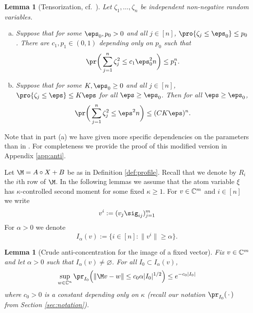 \documentclass[aop,preprint]{imsart}
\theoremstyle{plain}
\newtheorem{lemma}[theorem]{Lemma}
\theoremstyle{definition}
\theoremstyle{remark}
\numberwithin{equation}{section}
\numberwithin{theorem}{section}
\begin{document}
\begin{lemma}[Tensorization, cf.\ {\cite[Lemma 2.2]{RuVe:ilo}}]	\label{lem:tensorize}
Let $\zeta_1,\dots, \zeta_n$ be independent non-negative random variables.
\begin{enumerate}[(a)]
\item Suppose that for some $\eps_0,p_0>0$ and all $j\in [n]$, $\pro{\zeta_j\le \eps_0}\le p_0$. There are $c_1,p_1\in (0,1)$ depending only on $p_0$ such that
\begin{equation}
\pr\bigg( \sum_{j=1}^n \zeta_j^2 \le c_1\eps_0^2n\bigg) \le p_1^n.
\end{equation}
\item  Suppose that for some $K,\eps_0\ge 0$ and all $j\in [n]$, $\pro{\zeta_j\le\eps} \le K\eps$ for all $\eps\ge \eps_0$.
Then for all $\eps\ge \eps_0$,
\begin{equation}
\pr\bigg( \sum_{j=1}^n \zeta_j^2 \le\eps^2n \bigg) \le (CK\eps)^n.
\end{equation}
\end{enumerate}
\end{lemma}

Note that in part (a) we have given more specific dependencies on the parameters than in \citep{RuVe:ilo}. For completeness we provide the proof of this modified version in Appendix \ref{app:anti}.

Let $\M=A\circ X+B$ be as in Definition \ref{def:profile}.
Recall that we denote by $R_i$ the $i$th row of $\M$.
%
In the following lemmas we assume that the atom variable $\xi$ has $\kappa$-controlled second moment for some fixed $\kappa\ge1$.
For $v\in {\mathbb C}^m$ and $i\in [n]$ we write 
\begin{equation}	\label{def:vi}
v^i :=(v_j\sig_{ij})_{j=1}^m
\end{equation}
For $\alpha>0$ we denote 
\begin{equation}	\label{def:Ialpha}
I_\alpha(v):= \{i\in [n]: \|v^i\|\ge \alpha\}.
\end{equation}

\begin{lemma}[Crude anti-concentration for the image of a fixed vector]	\label{lem:fixed_crude}
Fix $v\in {\mathbb C}^m$ and let $\alpha>0$ such that $I_\alpha(v)\ne \varnothing$.
For all $I_0\subset I_\alpha(v)$, 
\begin{equation}
\sup_{w\in \C^n} \pr_{I_0}\Big( \|\M v -w\| \le c_0 \alpha|I_0|^{1/2} \Big) \le e^{-c_0|I_0|}
\end{equation}
where $c_0>0$ is a constant depending only on $\kappa$ (recall our notation $\pr_{I_0}(\,\cdot\,)$ from Section \ref{sec:notation}).
\end{lemma}
\end{document}
